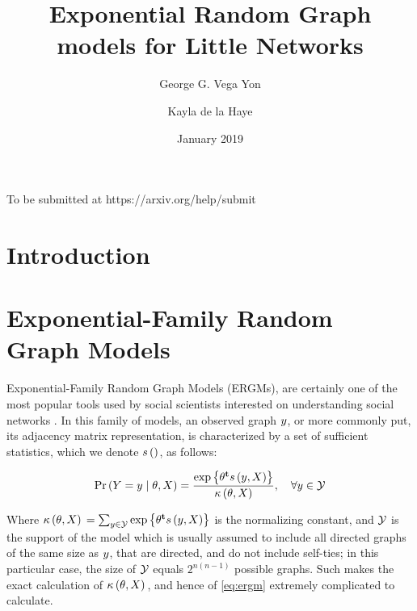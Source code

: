 \documentclass[12pt]{article}
\title{Exponential Random Graph models for Little Networks}
\author{George G. Vega Yon \and Kayla de la Haye}
\date{January 2019}
\begin{document}
\maketitle

To be submitted at https://arxiv.org/help/submit

\section{Introduction}

\section{Exponential-Family Random Graph Models}

Exponential-Family Random Graph Models (ERGMs), are certainly one of the most popular tools used by social scientists interested on understanding social networks \cite[and others]{Robins2007,Holland1981,Wasserman1996,Snijders2006}. In this family of models, an observed graph $y$, or more commonly put, its adjacency matrix representation, is characterized by a set of sufficient statistics, which we denote $s\left(\right)$, as follows:

\begin{equation}
\label{eq:ergm}
  \Prcond{\Adjmat = \adjmat}{\params, \Indepvar} = \frac{%
  	\exp{\transpose{\params}\sufstats{\adjmat, \Indepvar}}%
  }{
  	\kappa\left(\params, \Indepvar\right)
  },\quad\forall \adjmat\in\ADJMAT
\end{equation}

\noindent Where $\kappa\left(\theta, X\right){} = \sum_{y\in\mathcal{Y}}\mbox{exp}\left\{{\theta}^\mathbf{t}s\left(y, X\right)\right\}$ is the normalizing constant, and $\mathcal{Y}$ is the support of the model which is usually assumed to include all directed graphs of the same size as $y$, that are directed, and do not include self-ties; in this particular case, the size of $\mathcal{Y}$ equals $2^{n(n-1)}$ possible graphs. Such makes the exact calculation of $\kappa\left(\theta, X\right){}$, and hence of \eqref{eq:ergm} extremely complicated to calculate.
\end{document}
